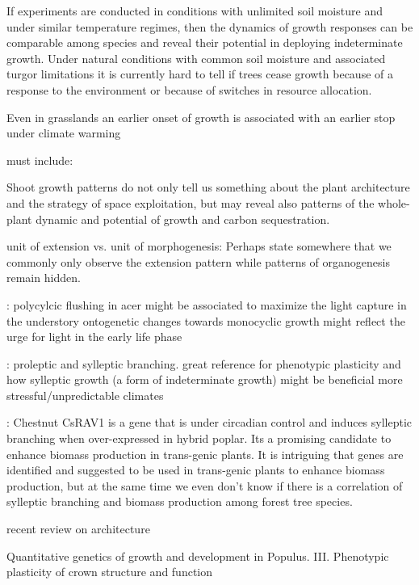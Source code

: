 \documentclass{article}
\begin{document}
If experiments are conducted in conditions with unlimited soil moisture and under similar temperature regimes, then the dynamics of growth responses can be comparable among species and reveal their potential in deploying indeterminate growth. Under natural conditions with common soil moisture and associated turgor limitations it is currently hard to tell if trees cease growth because of a response to the environment or because of switches in resource allocation. 
 
 Even in grasslands an earlier onset of growth is associated with an earlier stop under climate warming \cite{mohlGrowthAlpineGrassland2022a}
	
	
	must include: 
	
	\cite{iwasaOptimalGrowthSchedule1989}
	
	
	
	Shoot growth patterns do not only tell us something about the plant architecture and the strategy of space exploitation, but may reveal also patterns of the whole-plant dynamic and potential of growth and carbon sequestration.
	
	unit of extension vs. unit of morphogenesis: Perhaps state somewhere that we commonly only observe the extension pattern while patterns of organogenesis remain hidden. 
	
	\citep{verduEvolutionaryCorrelationsPolycyclic2007}: polycylcic flushing in acer might be associated to maximize the light capture in the understory
	ontogenetic changes towards monocyclic growth might reflect the urge for light in the early life phase
	
	 \citep{wuPhenotypicPlasticitySylleptic2001}: proleptic and sylleptic branching. great reference for phenotypic plasticity and how sylleptic growth (a form of indeterminate growth) might be beneficial more stressful/unpredictable climates
	
	\citep{moreno-cortesCsRAV1InducesSylleptic2012}: Chestnut CsRAV1 is a gene that is under circadian control and induces sylleptic branching when over-expressed in hybrid poplar. Its a promising candidate to enhance biomass production in trans-genic plants. It is intriguing that genes are identified and suggested to be used in trans-genic plants to enhance biomass production, but at the same time we even don't know if there is a correlation of sylleptic branching and biomass production among forest tree species.
	
	\citep{hollenderMolecularBasisAngiosperm2015} recent review on architecture
	
	\citep{wuQuantitativeGeneticsGrowth1998}Quantitative genetics of growth and development in Populus. III. Phenotypic plasticity of crown structure and function
	
	\newpage
	
	
	
	
	
	
\end{document}
